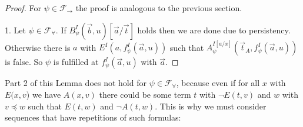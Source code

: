 \documentclass[a4paper,12pt]{report}
\theoremstyle{definition}
\theoremstyle{definition}
\theoremstyle{definition}
\theoremstyle{definition}
\theoremstyle{definition}
\theoremstyle{definition}
\theoremstyle{definition}
\begin{document}
	\begin{proof}
		For $\psi\in\mathcal F_\to$ the proof is analogous to the previous section.
		
		1. Let $\psi\in\mathcal F_\forall$. If $B^I_\psi(\vec b, u)[\vec a/\vec t]$ holds then we are done due to persistency. Otherwise there is $a$ with $E^I(a, f^I_\psi(\vec a, u))$ such that $A^{I[a/x]}_\psi(\vec t_A, f^I_\psi(\vec a, u))$ is false. So $\psi$ is fulfilled at $f^I_\psi(\vec a, u)$ with $\vec a$.
	\end{proof}
	
	Part 2 of this Lemma does not hold for $\psi\in\mathcal F_\forall$, because even if for all $x$ with $E(x, v$) we have $A(x, v)$ there could be some term $t$ with $\neg E(t, v)$ and $w$ with $v\preceq w$ such that $E(t, w)$ and $\neg A(t, w)$. This is why we must consider sequences that have repetitions of such formulas:
	
\end{document}
